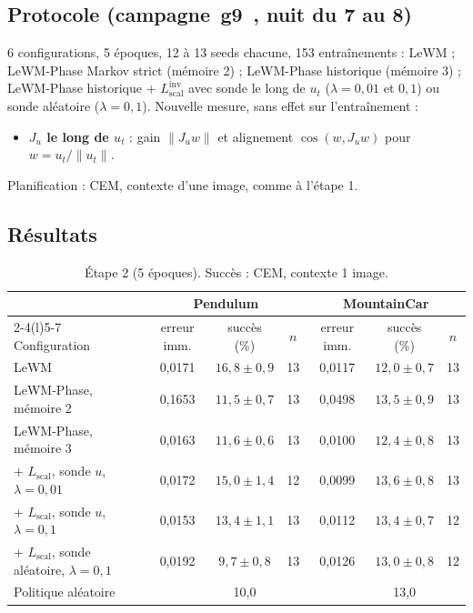 \documentclass[11pt,a4paper]{article}
\newcommand{\og}{\guillemotleft\,\ignorespaces}
\newcommand{\fg}{\unskip\,\guillemotright}
\newcommand{\Lscal}{L_{\mathrm{scal}}}
\begin{document}
\subsection{Protocole (campagne \og g9 \fg{}, nuit du 7 au 8)}

6 configurations, 5 époques, 12 à 13 seeds chacune, 153 entraînements :
LeWM ; LeWM-Phase Markov strict (mémoire 2) ; LeWM-Phase historique (mémoire 3) ; LeWM-Phase historique +
$\Lscal^{\mathrm{inv}}$ avec sonde le long de $u_t$ ($\lambda = 0{,}01$ et $0{,}1$) ou sonde
aléatoire ($\lambda = 0{,}1$). Nouvelle mesure, sans effet sur l'entraînement :
\begin{itemize}
  \item \textbf{$J_u$ le long de $u_t$} : gain $\|J_u w\|$ et alignement $\cos(w, J_u w)$ pour
  $w = u_t/\|u_t\|$.
\end{itemize}
Planification : CEM, contexte d'une image, comme à l'étape 1.

\subsection{Résultats}

\begin{table}[htbp]
\centering\small
\begin{tabular}{@{}lcccccc@{}}
\toprule
& \multicolumn{3}{c}{Pendulum} & \multicolumn{3}{c}{MountainCar} \\
\cmidrule(lr){2-4}\cmidrule(l){5-7}
Configuration & erreur imm. & succès (\%) & $n$ & erreur imm. & succès (\%) & $n$ \\
\midrule
LeWM                                  & 0,0171 & $16{,}8 \pm 0{,}9$ & 13 & 0,0117 & $12{,}0 \pm 0{,}7$ & 13 \\
LeWM-Phase, mémoire 2                     & 0,1653 & $11{,}5 \pm 0{,}7$ & 13 & 0,0498 & $13{,}5 \pm 0{,}9$ & 13 \\
LeWM-Phase, mémoire 3                     & 0,0163 & $11{,}6 \pm 0{,}6$ & 13 & 0,0100 & $12{,}4 \pm 0{,}8$ & 13 \\
\quad + $\Lscal$, sonde $u$, $\lambda=0{,}01$ & 0,0172 & $15{,}0 \pm 1{,}4$ & 12 & 0,0099 & $13{,}6 \pm 0{,}8$ & 13 \\
\quad + $\Lscal$, sonde $u$, $\lambda=0{,}1$  & 0,0153 & $13{,}4 \pm 1{,}1$ & 13 & 0,0112 & $13{,}4 \pm 0{,}7$ & 12 \\
\quad + $\Lscal$, sonde aléatoire, $\lambda=0{,}1$ & 0,0192 & $9{,}7 \pm 0{,}8$ & 13 & 0,0126 & $13{,}0 \pm 0{,}8$ & 12 \\
\midrule
Politique aléatoire & & 10,0 & & & 13,0 & \\
\bottomrule
\end{tabular}
\caption{Étape 2 (5 époques). Succès : CEM, contexte 1 image.}
\label{tab:g9}
\end{table}
\end{document}
